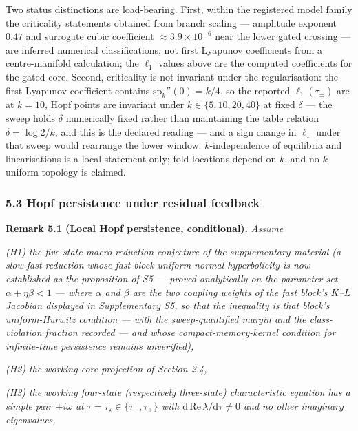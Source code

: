 \documentclass[11pt]{article}
\begin{document}
Two status distinctions are load-bearing. First, within the registered
model family the criticality statements obtained from branch scaling ---
amplitude exponent \(0.47\) and surrogate cubic coefficient
\(\approx3.9\times10^{-6}\) near the lower gated crossing --- are
inferred numerical classifications, not first Lyapunov coefficients from
a centre-manifold calculation; the \(\ell_1\) values above are the
computed coefficients for the gated core. Second, criticality is not
invariant under the regularisation: the first Lyapunov coefficient
contains \(\mathrm{sp}_k''(0) = k/4\), so the reported
\(\ell_1(\tau_\pm)\) are at \(k = 10\), Hopf points are invariant under
\(k \in \{5, 10, 20, 40\}\) at fixed \(\delta\) --- the sweep holds
\(\delta\) numerically fixed rather than maintaining the table relation
\(\delta = \log 2/k\), and this is the declared reading --- and a sign
change in \(\ell_1\) under that sweep would rearrange the lower window.
\(k\)-independence of equilibria and linearisations is a local statement
only; fold locations depend on \(k\), and no \(k\)-uniform topology is
claimed.

\subsubsection{5.3 Hopf persistence under residual
feedback}\label{hopf-persistence-under-residual-feedback}

\textbf{Remark 5.1 (Local Hopf persistence, conditional).} \emph{Assume}

\emph{(H1) the five-state macro-reduction conjecture of the
supplementary material (a slow-fast reduction whose fast-block uniform
normal hyperbolicity is now established as the proposition of S5 ---
proved analytically on the parameter set \(\alpha + \eta\beta < 1\) ---
where \(\alpha\) and \(\beta\) are the two coupling weights of the fast
block's \(K\)--\(L\) Jacobian displayed in Supplementary S5, so that the
inequality is that block's uniform-Hurwitz condition --- with the
sweep-quantified margin and the class-violation fraction recorded ---
and whose compact-memory-kernel condition for infinite-time persistence
remains unverified),}

\emph{(H2) the working-core projection of Section 2.4,}

\emph{(H3) the working four-state (respectively three-state)
characteristic equation has a simple pair \(\pm i\omega\) at
\(\tau = \tau_\star \in \{\tau_-, \tau_+\}\) with
\(\mathrm{d\,Re}\,\lambda/\mathrm{d}\tau \ne 0\) and no other imaginary
eigenvalues,}
\end{document}
